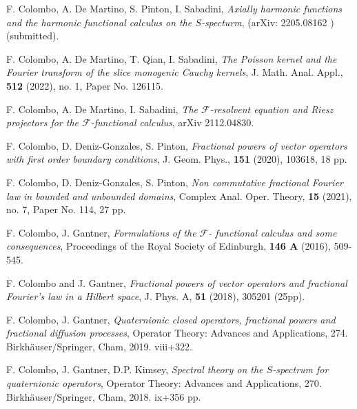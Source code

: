 \documentclass[reqno,11pt]{amsart}
\numberwithin{equation}{section}
\theoremstyle{definition}
\begin{document}
\begin{thebibliography}{99}
 F. Colombo, A. De Martino, S. Pinton, I. Sabadini, \emph{Axially harmonic functions and the harmonic functional calculus on the $S$-specturm}, (arXiv: 2205.08162 ) (submitted).




 F. Colombo, A. De Martino, T. Qian, I. Sabadini, \emph{The Poisson kernel and the Fourier transform of the slice monogenic Cauchy kernels},
     J. Math. Anal. Appl., {\bf 512} (2022), no. 1, Paper No. 126115.

 F. Colombo, A. De Martino, I. Sabadini, \emph{The $ \mathcal{F}$-resolvent equation and Riesz projectors for the $ \mathcal{F}$-functional calculus}, arXiv 2112.04830.



F. Colombo, D. Deniz-Gonzales, S. Pinton,
{\em Fractional powers of vector operators with first order boundary conditions},
J. Geom. Phys., {\bf 151} (2020), 103618, 18 pp.

F. Colombo, D. Deniz-Gonzales, S. Pinton,
{\em Non commutative fractional Fourier law in bounded and unbounded domains},
 Complex Anal. Oper. Theory, {\bf 15} (2021), no. 7, Paper No. 114, 27 pp.



 F. Colombo, J. Gantner, \emph{Formulations of the $ \mathcal{F}$- functional calculus and some consequences}, Proceedings of the Royal Society of Edinburgh, \textbf{146 A}  (2016), 509-545.

F. Colombo and J. Gantner, {\em Fractional powers of vector operators and fractional Fourier's law in a Hilbert space},
 J. Phys. A,  {\bf 51} (2018), 305201 (25pp).


 F. Colombo, J. Gantner,
{\em Quaternionic closed operators, fractional powers and fractional diffusion processes},
Operator Theory: Advances and Applications, 274. Birkh\"auser/Springer, Cham, 2019. viii+322.

 F. Colombo, J. Gantner, D.P. Kimsey, {\em Spectral theory on the $S$-spectrum for quaternionic operators}, Operator Theory: Advances and Applications, 270.
Birkh\"auser/Springer, Cham, 2018. ix+356 pp.



\end{thebibliography}
\end{document}
